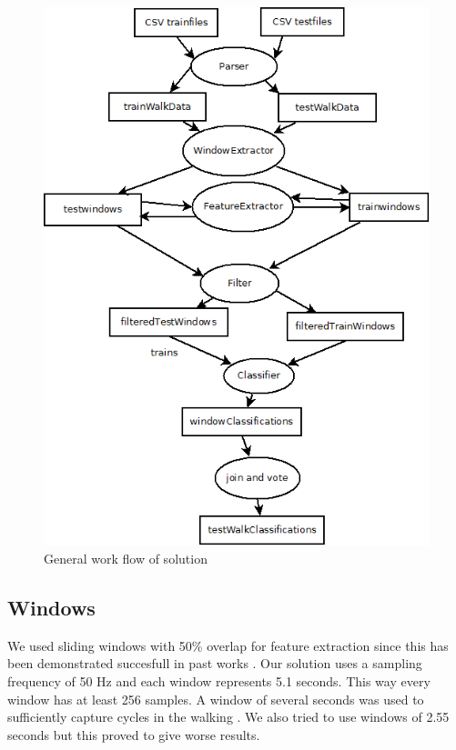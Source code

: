 \begin{figure}[ht]

\centering
\includegraphics[scale=0.5]{flow.png}
\caption{General work flow of solution}\label{flow}
\end{figure}

\subsection{Windows}
We used sliding windows with 50\% overlap for feature extraction since this has been demonstrated succesfull in past works \cite{bao2004activity}. Our solution uses a sampling frequency of 50 Hz and each window represents 5.1 seconds. This way every window has at least 256 samples. A window of several seconds
was used to sufficiently capture cycles in the walking \cite{bao2004activity}.
We also tried to use windows of 2.55 seconds but this proved to give worse results.

